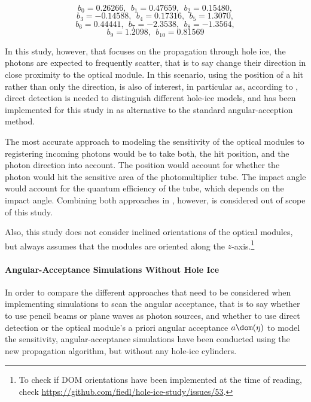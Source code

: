 $$ b_0 = 0.26266, \ \ b_1 = 0.47659, \ \ b_2 = 0.15480, $$
$$ b_3 = -0.14588, \ \ b_4 = 0.17316, \ \ b_5 = 1.3070, $$
$$ b_6 = 0.44441, \ \ b_7 = -2.3538, \ \ b_8 = -1.3564, $$
$$ b_9 = 1.2098, \ \ b_{10} = 0.81569 $$

In this study, however, that focuses on the propagation through hole ice, the photons are expected to frequently scatter, that is to say change their direction in close proximity to the optical module. In this scenario, using the position of a hit rather than only the direction, is also of interest, in particular as, according to  \cite{martinspicehddard}, direct detection is needed to distinguish different hole-ice models, and has been implemented for this study in  as alternative to the standard angular-acception method.


The most accurate approach to modeling the sensitivity of the optical modules to registering incoming photons would be to take both, the hit position, and the photon direction into account. The position would account for whether the photon would hit the sensitive area of the photomultiplier tube. The impact angle would account for the quantum efficiency of the tube, which depends on the impact angle. Combining both approaches in , however, is considered out of scope of this study.

Also, this study does not consider inclined orientations of the optical modules, but always assumes that the modules are oriented along the $z$-axis.\footnote{To check if DOM orientations have been implemented at the time of reading, check \url{https://github.com/fiedl/hole-ice-study/issues/53}.}



\paragraph{Angular-Acceptance Simulations Without Hole Ice}
In order to compare the different approaches that need to be considered when implementing simulations to scan the angular acceptance, that is to say whether to use pencil beams or plane waves as photon sources, and whether to use direct detection or the optical module's a priori angular acceptance $a\dom(\eta)$ to model the sensitivity, angular-acceptance simulations have been conducted using the new propagation algorithm, but without any hole-ice cylinders.

